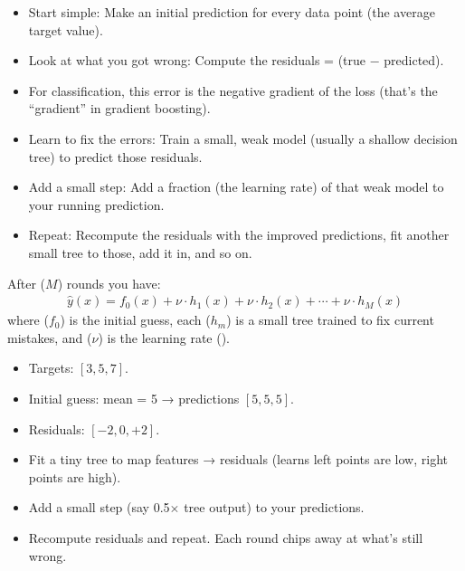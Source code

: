 \begin{itemize}
	\item Start simple: Make an initial prediction for every data point (\eg the average target value).
	\item Look at what you got wrong: Compute the residuals = (true − predicted).
	\item For classification, this error is the negative gradient of the loss (that’s the “gradient” in gradient boosting).
	\item Learn to fix the errors: Train a small, weak model (usually a shallow decision tree) to predict those residuals.
	\item Add a small step: Add a fraction (the learning rate) of that weak model to your running prediction.
	\item Repeat: Recompute the residuals with the improved predictions, fit another small tree to those, add it in, and so on.
\end{itemize}

After ($M$) rounds you have:
\begin{align*}
	\hat{y}(x) = f_0(x) + \nu \cdot h_1(x) + \nu \cdot h_2(x) + \cdots + \nu \cdot h_M(x)
\end{align*}
where ($f_0$) is the initial guess, each ($h_m$) is a small tree trained to fix current mistakes, and ($\nu$) is the learning rate ().

\begin{itemize}
	\item Targets: $[3, 5, 7]$.
	\item Initial guess: mean = 5 → predictions $[5, 5, 5]$.
	\item Residuals: $[-2, 0, +2]$.
	\item Fit a tiny tree to map features → residuals (learns left points are low, right points are high).
	\item Add a small step (say 0.5$\times$ tree output) to your predictions.
	\item Recompute residuals and repeat. Each round chips away at what's still wrong.
\end{itemize}

